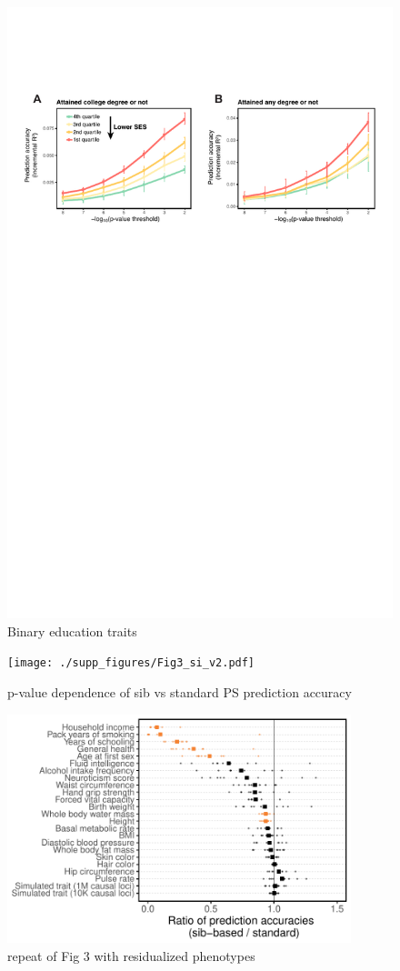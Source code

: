 \documentclass[hidelinks, 12pt]{article}
\begin{document}
\begin{figure}[h!]
\centering
\includegraphics[width=\textwidth]{./supp_figures/binary_edu_traits.pdf}
\caption{Binary education traits}
\end{figure}


\begin{figure}[h!]
\centering
\texttt{[image: ./supp\_figures/Fig3\_si\_v2.pdf]}
\caption{p-value dependence of sib vs standard PS prediction accuracy}
\end{figure}

\begin{figure}[h!]
\centering
\includegraphics[width=10cm]{./supp_figures/fig3_panelA_SI.pdf}
\caption{repeat of Fig 3 with residualized phenotypes}
\end{figure}
\end{document}
